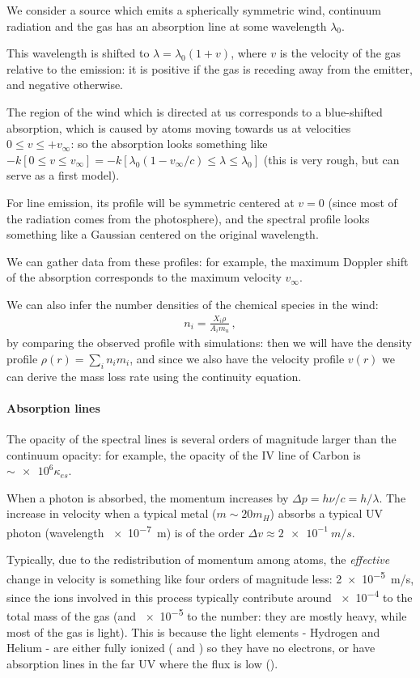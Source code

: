 \documentclass[main.tex]{subfiles}
\begin{document}
We consider a source which emits a spherically symmetric wind, continuum radiation and the gas has an absorption line at some wavelength \(\lambda_0 \). 

This wavelength is shifted to \(\lambda = \lambda_0 (1 + v)\), where \(v\) is the velocity of the gas relative to the emission: it is positive if the gas is receding away from the emitter, and negative otherwise.

The region of the wind which is directed at us corresponds to a blue-shifted absorption, which is caused by atoms moving towards us at velocities \(0 \leq v \leq + v_\infty\): so the absorption looks something like \(- k [0 \leq v \leq v_\infty] = - k [\lambda_0 (1 - v_{ \infty}/c) \leq \lambda \leq \lambda_0 ]\) (this is very rough, but can serve as a first model).

For line emission, its profile will be symmetric centered at \(v=0\) (since most of the radiation comes from the photosphere), and the spectral profile looks something like a Gaussian centered on the original wavelength.

We can gather data from these profiles: for example, the maximum Doppler shift of the absorption corresponds to the maximum velocity \(v_{ \infty }\).

We can also infer the number densities of the chemical species in the wind: 
%
\begin{align}
  n_i  = \frac{X_i \rho }{A_i m_u}
\,,
\end{align}
%
by comparing the observed profile with simulations: then we will have the density profile \(\rho (r) = \sum_i n_i m_i\), and since we also have the velocity profile \(v(r)\) we can derive the mass loss rate using the continuity equation.

\paragraph{Absorption lines}

The opacity of the spectral lines is several orders of magnitude larger than the continuum opacity: for example, the opacity of the IV line of Carbon is \(\sim \num{e6} \kappa_{es}\).

When a photon is absorbed, the momentum increases by \(\Delta p = h \nu / c = h / \lambda \). 
The increase in velocity when a typical metal (\(m \sim 20 m_H\)) absorbs a typical UV photon (wavelength \SI{e-7}{m}) is of the order \(\Delta v \approx \SI{2e-1}{m/s}\). 

Typically, due to the redistribution of momentum among atoms, the \emph{effective} change in velocity is something like four orders of magnitude less: \SI{2e-5}{m/s}, since the ions involved in this process typically contribute around \num{e-4} to the total mass of the gas (and \num{e-5} to the number: they are mostly heavy, while most of the gas is light).
This is because the light elements - Hydrogen and Helium - are either fully ionized ( and ) so they have no electrons, or have absorption lines in the far UV where the flux is low ().
\end{document}
